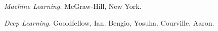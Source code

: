 \documentclass[reqno,twoside, 12pt]{report}
\begin{document}
%

%







%
\begin{thebibliography}{99}
	 \hspace{-.22cm} \textit{Machine Learning.} McGraw-Hill, New York.
	
	 \hspace{-.22cm} \textit{Deep Learning.} Gooldfellow, Ian. \textbar  Bengio, Yosuha. \textbar	  Courville, Aaron. 

\end{thebibliography}
\end{document}
